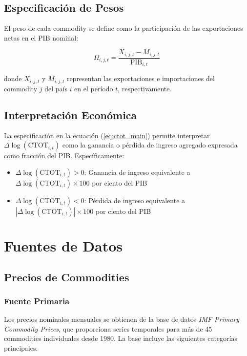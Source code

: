 \documentclass[12pt,a4paper]{article}
\begin{document}
\subsection{Especificación de Pesos}

El peso de cada commodity se define como la participación de las exportaciones netas en el PIB nominal:

\begin{equation}
\Omega_{i,j,t} = \frac{X_{i,j,t} - M_{i,j,t}}{\text{PIB}_{i,t}}
\label{eq:weights}
\end{equation}

donde $X_{i,j,t}$ y $M_{i,j,t}$ representan las exportaciones e importaciones del commodity $j$ del país $i$ en el período $t$, respectivamente.

\subsection{Interpretación Económica}

La especificación en la ecuación (\ref{eq:ctot_main}) permite interpretar $\Delta \log(\text{CTOT}_{i,t})$ como la ganancia o pérdida de ingreso agregado expresada como fracción del PIB. Específicamente:

\begin{itemize}
    \item $\Delta \log(\text{CTOT}_{i,t}) > 0$: Ganancia de ingreso equivalente a $\Delta \log(\text{CTOT}_{i,t}) \times 100$ por ciento del PIB
    \item $\Delta \log(\text{CTOT}_{i,t}) < 0$: Pérdida de ingreso equivalente a $|\Delta \log(\text{CTOT}_{i,t})| \times 100$ por ciento del PIB
\end{itemize}

\section{Fuentes de Datos}

\subsection{Precios de Commodities}

\subsubsection{Fuente Primaria}
Los precios nominales mensuales se obtienen de la base de datos \textit{IMF Primary Commodity Prices}, que proporciona series temporales para más de 45 commodities individuales desde 1980. La base incluye las siguientes categorías principales:
\end{document}

